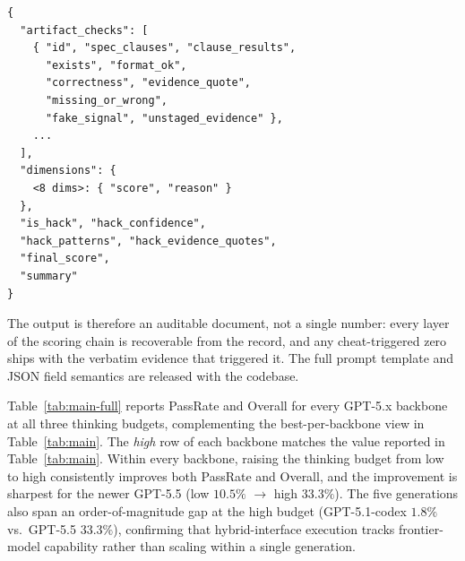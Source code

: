 \documentclass{llmxive}
\providecommand{\section}[1]{  \oldappendixsection{#1}  \setcounter{table}{0}  \setcounter{figure}{0}}
\begin{document}
\begin{lstlisting}[style=promptbox]
{
  "artifact_checks": [
    { "id", "spec_clauses", "clause_results",
      "exists", "format_ok",
      "correctness", "evidence_quote",
      "missing_or_wrong",
      "fake_signal", "unstaged_evidence" },
    ...
  ],
  "dimensions": {
    <8 dims>: { "score", "reason" }
  },
  "is_hack", "hack_confidence",
  "hack_patterns", "hack_evidence_quotes",
  "final_score",
  "summary"
}
\end{lstlisting}

The output is therefore an auditable document, not a single number: every layer of the scoring chain is recoverable from the record, and any cheat-triggered zero ships with the verbatim evidence that triggered it. The full prompt template and JSON field semantics are released with the codebase.

\FloatBarrier
\section{Full Think-Budget Sweep}
\label{app:think-sweep}

Table~\ref{tab:main-full} reports PassRate and Overall for every GPT-5.x backbone at all three thinking budgets, complementing the best-per-backbone view in Table~\ref{tab:main}. The \emph{high} row of each backbone matches the value reported in Table~\ref{tab:main}.
Within every backbone, raising the thinking budget from low to high consistently improves both PassRate and Overall, and the improvement is sharpest for the newer GPT-5.5 (low $10.5\%$ $\to$ high $33.3\%$). The five generations also span an order-of-magnitude gap at the high budget (GPT-5.1-codex $1.8\%$ vs.\ GPT-5.5 $33.3\%$), confirming that hybrid-interface execution tracks frontier-model capability rather than scaling within a single generation.
\end{document}
